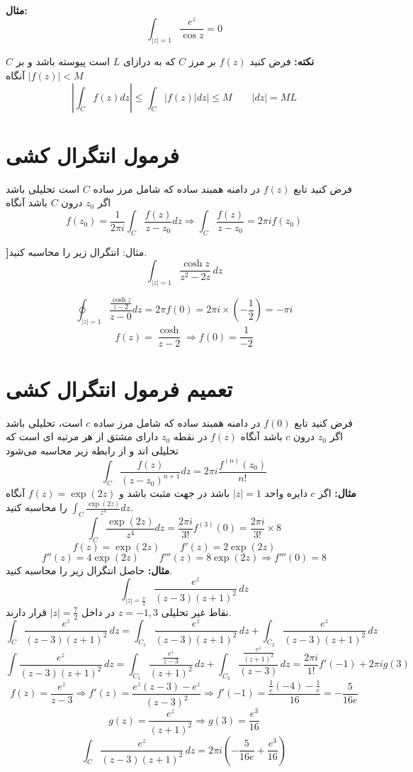 \documentclass[12pt]{report}
\begin{document}
	 \textbf{مثال:}
	 $$\int_{|z| =1} \frac{e^z}{\cos z} = 0$$
	 
	 \textbf{نکته:}
	 فرض کنید
	 $f(z)$
	 بر مرز 
	 $C$
	 که به درازای 
	 $L$
	 است پیوسته باشد و بر 
	 $C$
	 $|f(z)| < M$
	 آنگاه 
	 $$|\int_{C} f(z)dz| \leq \int_{C} |f(z) |dz| \leq M \qquad |dz| = ML$$
	 
	 \section{فرمول انتگرال کشی}
	 فرض کنید تابع
	 $f(z)$
	 در دامنه همبند ساده که شامل مرز ساده 
	 $C$
	 است تحلیلی باشد اگر 
	 $z_0$
	 درون 
	 $C$
	 باشد آنگاه
	 $$f(z_0) = \frac{1}{2\pi i} \int_{C} \frac{f(z)}{z - z_0} dz \Rightarrow \int_{C} \frac{f(z)}{z - z_0} = 2\pi i f(z_0)$$
	 
	 \textbf]{مثال:}
	 انتگرال زیر را محاسبه کنید.
	 $$\int_{|z| =1} \frac{\cosh z}{z^2 - 2z}\, dz$$
	 
	 $$\oint_{|z| = 1} \frac{\frac{\cosh z}{z - 2}}{z - 0} dz = 2\pi f(0) = 2\pi i \times (-\frac{1}{2}) = -\pi i$$
	 $$f(z) = \frac{\cosh }{ z -2} \Rightarrow f(0) = \frac{1}{-2}$$
	 
	 \section{تعمیم فرمول انتگرال کشی}
	 فرض کنید تابع
	$f(0)$
	در دامنه همبند ساده که شامل مرز ساده 
	$c$
	است، تحلیلی باشد اگر 
	$z_0$
	درون 
	$c$
	باشد آنگاه 
	$f(z)$
	در نقطه 
	$z_0$
	دارای مشتق از هر مرتبه ای است که تحلیلی اند و از رابطه زیر محاسبه می‌شود
	$$\int_{C} \frac{f(z)}{(z - z_0)^{n+1}} dz = 2\pi i \frac{f^{(n)}(z_0)}{n!}$$
	\textbf{مثال:}
	اگر
	$c$
	دایره واحد
	$|z| = 1$
	باشد در جهت مثبت باشد و
	$f(z) = \exp(2z)$
	آنگاه
	$\int_{C} \frac{\exp(2z)}{z^4} dz$
	را محاسبه کنید.
	$$\int_{C} \frac{\exp(2z)}{z^4} dz = \frac{2\pi i }{3!} f^{(3)}(0) = \frac{2\pi i }{3!} \times 8$$
	$$f(z) = \exp(2z) \qquad
	f'(z) = 2\exp(2z)\qquad
	$$
	$$f''(z) = 4\exp(2z)\qquad
	f'''(z) = 8\exp(2z) \Rightarrow f'''(0) = 8$$
	\newline
	\textbf{مثال:}
	حاصل انتگرال زیر را محاسبه کنید.
	$$\int_{|z| =\frac{7}{2}} \frac{e^z}{(z - 3)(z+1)^2}\,dz$$
	نقاط غیر تحلیلی
	$z = -1, 3$
	در داخل
	$|z| =\frac{7}{2}$
	قرار دارند.
	$$\int_{C} \frac{e^z}{(z - 3)(z+1)^2}\, dz = \int_{C_1} \frac{e^z}{(z - 3)(z+1)^2}\, dz + \int_{C_2} \frac{e^z}{(z - 3)(z+1)^2}\, dz$$
	$$\int \frac{e^z}{(z - 3)(z+1)^2}\, dz = \int_{C_1} \frac{\frac{e^z}{z - 3}}{(z+1)^2}\, dz +\int_{C_2} \frac{\frac{e^z}{(z+ 1)^2}}{(z-3)}\, dz = \frac{2\pi i}{1!} f'(-1) + 2\pi i g(3)$$
	$$f(z) = \frac{e^z}{z - 3} \Rightarrow f'(z) = \frac{e^z(z - 3) - e^z}{(z - 3)^2} \Rightarrow f'(-1) = \frac{\frac{1}{e}(-4) - \frac{1}{e}}{16} = -\frac{5}{16e}$$
	$$g(z) = \frac{e^z}{(z + 1)^2} \Rightarrow g(3) = \frac{e^3}{16}$$
	$$\int_{C} \frac{e^z}{(z - 3)(z+1)^2}\, dz = 2\pi i(-\frac{5}{16e} + \frac{e^3}{16})$$
	
\end{document}
